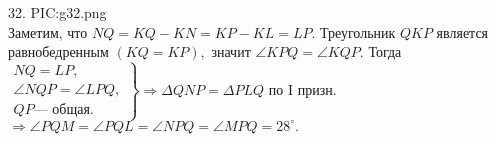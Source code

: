 32. {{PIC:g32.png}}\\
Заметим, что $NQ=KQ-KN=KP-KL=LP.$ Треугольник $QKP$ является равнобедренным $(KQ=KP),$ значит $\angle KPQ=\angle KQP.$ Тогда
$\left.\begin{array}{l}NQ=LP,\\
\angle NQP=\angle LPQ,\\
QP\text{--- общая.}  \end{array}\right\}\Rightarrow \Delta QNP=\Delta PLQ\text{ по I призн.}$\\$\Rightarrow \angle PQM=\angle PQL=\angle NPQ=\angle MPQ=28^\circ.$\\
